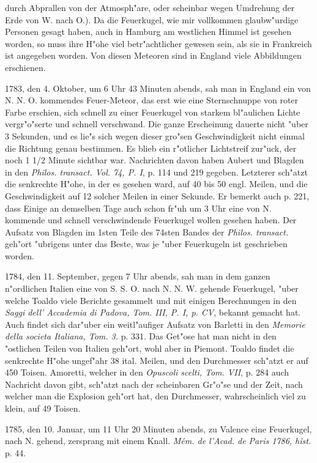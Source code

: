 \documentclass[a4paper, 11pt, oneside, polutonikogreek, german]{article}
\begin{document}
durch Abprallen von der Atmosph"are, oder scheinbar wegen Umdrehung der Erde von W. nach O.). Da die Feuerkugel, wie mir vollkommen glaubw"urdige Personen gesagt haben, auch in Hamburg am westlichen Himmel ist gesehen worden, so muss ihre H"ohe viel betr"achtlicher gewesen sein, als sie in Frankreich ist angegeben worden. Von diesen Meteoren sind in England viele Abbildungen erschienen.

1783, den 4. Oktober, um 6 Uhr 43 Minuten abends, sah man in England ein von N. N. O. kommendes Feuer-Meteor, das erst wie eine Sternschnuppe von roter Farbe erschien, sich schnell zu einer Feuerkugel von starkem bl"aulichen Lichte vergr"o"serte und schnell verschwand. Die ganze Erscheinung dauerte nicht "uber 3 Sekunden, und es lie"s sich wegen dieser gro"sen Geschwindigkeit nicht einmal die Richtung genau bestimmen. Es blieb ein r"otlicher Lichtstreif zur"uck, der noch 1 1/2 Minute sichtbar war. Nachrichten davon haben Aubert und Blagden in den \emph{Philos. transact. Vol. 74, P. I}, p. 114 und 219 gegeben. Letzterer sch"atzt die senkrechte H"ohe, in der es gesehen ward, auf 40 bis 50 engl. Meilen, und die Geschwindigkeit auf 12 solcher Meilen in einer Sekunde. Er bemerkt auch p. 221, dass Einige an demselben Tage auch schon fr"uh um 3 Uhr eine von N. kommende und schnell verschwindende Feuerkugel wollen gesehen haben. Der Aufsatz von Blagden im 1sten Teile des 74sten Bandes der \emph{Philos. transact.} geh"ort "ubrigens unter das Beste, was je "uber Feuerkugeln ist geschrieben worden.

1784, den 11. September, gegen 7 Uhr abends, sah man in dem ganzen n"ordlichen Italien eine von S. S. O. nach N. N. W. gehende Feuerkugel, "uber welche Toaldo viele Berichte gesammelt und mit einigen Berechnungen in den \emph{Saggi dell' Accademia di Padova, Tom. III, P. I, p. CV}, bekannt gemacht hat. Auch findet sich dar"uber ein weitl"aufiger Aufsatz von Barletti in den \emph{Memorie della societa Italiana, Tom. 3.} p. 331. Das Get"ose hat man nicht in den "ostlichen Teilen von Italien geh"ort, wohl aber in Piemont. Toaldo findet die senkrechte H"ohe ungef"ahr 38 ital. Meilen, und den Durchmesser sch"atzt er auf 450 Toisen. Amoretti, welcher in den \emph{Opuscoli scelti, Tom. VII}, p. 284 auch Nachricht davon gibt, sch"atzt nach der scheinbaren Gr"o"se und der Zeit, nach welcher man die Explosion geh"ort hat, den Durchmesser, wahrscheinlich viel zu klein, auf 49 Toisen.

1785, den 10. Januar, um 11 Uhr 20 Minuten abends, zu Valence eine Feuerkugel, nach N. gehend, zersprang mit einem Knall. \emph{Mém. de l'Acad. de Paris 1786, hist.} p. 44.
\end{document}
